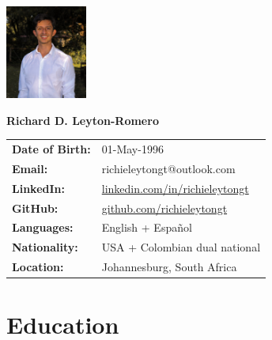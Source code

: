 \documentclass[12pt,letterpaper]{article} %
\begin{document}
\hfill{\includegraphics[width = 0.2\textwidth]{Headshot.jpg}}

\vspace{-120pt}
\textbf{\large Richard D. Leyton-Romero} \\

\vspace{5pt} %



\begin{tabular}{l l}
    \textbf{Date of Birth:} & 01-May-1996 \\
    \textbf{Email:} & richieleytongt@outlook.com \\
    \textbf{LinkedIn:} & \href{https://www.linkedin.com/in/richieleytongt/}{linkedin.com/in/richieleytongt} \\
    \textbf{GitHub:} & \href{https://github.com/richieleytongt}{github.com/richieleytongt} \\
    \textbf{Languages:} & English + Español \\
    \textbf{Nationality:} & USA + Colombian dual national \\
    \textbf{Location:} & Johannesburg, South Africa \\
    \end{tabular}

\vspace{0pt} %

\section*{Education}
\end{document}
